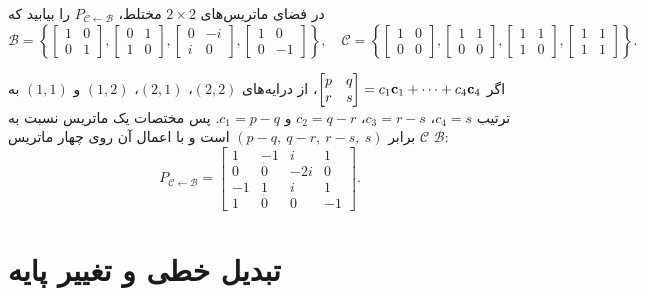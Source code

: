 \begin{example}
در فضای ماتریس‌های $2\times2$ مختلط، $P_{\mathcal{C}\leftarrow\mathcal{B}}$ را بیابید که
\[
\mathcal{B}=\left\{\begin{bmatrix}1&0\\0&1\end{bmatrix},\begin{bmatrix}0&1\\1&0\end{bmatrix},\begin{bmatrix}0&-i\\i&0\end{bmatrix},\begin{bmatrix}1&0\\0&-1\end{bmatrix}\right\},\quad
\mathcal{C}=\left\{\begin{bmatrix}1&0\\0&0\end{bmatrix},\begin{bmatrix}1&1\\0&0\end{bmatrix},\begin{bmatrix}1&1\\1&0\end{bmatrix},\begin{bmatrix}1&1\\1&1\end{bmatrix}\right\}.
\]
\end{example}
\begin{solution}
اگر $\begin{bmatrix}p&q\\r&s\end{bmatrix}=c_1\mathbf{c}_1+\dots+c_4\mathbf{c}_4$، از درایه‌های $(2,2)$، $(2,1)$، $(1,2)$ و $(1,1)$ به ترتیب $c_4=s$، $c_3=r-s$، $c_2=q-r$ و $c_1=p-q$. پس مختصات یک ماتریس نسبت به $\mathcal{C}$ برابر $(p-q,\ q-r,\ r-s,\ s)$ است و با اعمال آن روی چهار ماتریس $\mathcal{B}$:
\[
P_{\mathcal{C}\leftarrow\mathcal{B}}=\begin{bmatrix}1&-1&i&1\\0&0&-2i&0\\-1&1&i&1\\1&0&0&-1\end{bmatrix}.
\]
\end{solution}

\section{تبدیل خطی و تغییر پایه}

